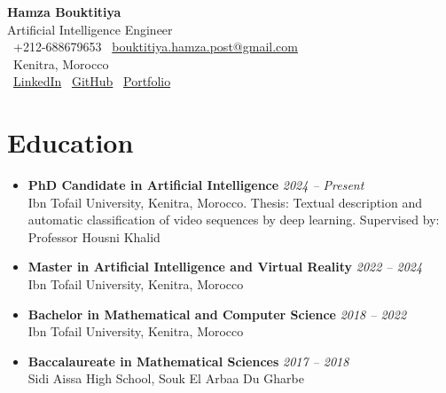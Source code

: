 \documentclass[10pt,a4paper]{article}
\newcommand{\cvheader}[4]{
    \begin{center}
        {\Huge\bfseries #1}\\[0.1em]
        {\large #2}\\[0.2em]
        \faPhone\ #3 \quad \faEnvelope\ \href{mailto:#4}{#4}\\[0.1em]
        \faMapMarker\ Kenitra, Morocco\\[0.1em]
        \faLinkedin\ \href{https://www.linkedin.com/in/hamza-bouktitiya-604471253/}{LinkedIn} \quad
        \faGithub\ \href{https://github.com/gothamza}{GitHub} \quad
        \faGlobe\ \href{https://gothamza.github.io/portfolio/}{Portfolio}
    \end{center}
    \vspace{-0.3em}
}
\newcommand{\cvitem}[2]{\textbf{#1} \hfill \textit{#2}}
\begin{document}
\cvheader{Hamza Bouktitiya}{Artificial Intelligence Engineer}{+212-688679653}{bouktitiya.hamza.post@gmail.com}

\section*{Education}
\begin{itemize}
    \item \cvitem{PhD Candidate in Artificial Intelligence}{2024 -- Present}\\
    Ibn Tofail University, Kenitra, Morocco. Thesis: Textual description and automatic classification of video sequences by deep learning. Supervised by: Professor Housni Khalid
    \item \cvitem{Master in Artificial Intelligence and Virtual Reality}{2022 -- 2024}\\
    Ibn Tofail University, Kenitra, Morocco
    \item \cvitem{Bachelor in Mathematical and Computer Science}{2018 -- 2022}\\
    Ibn Tofail University, Kenitra, Morocco
    \item \cvitem{Baccalaureate in Mathematical Sciences}{2017 -- 2018}\\
    Sidi Aissa High School, Souk El Arbaa Du Gharbe
\end{itemize}
\end{document}
